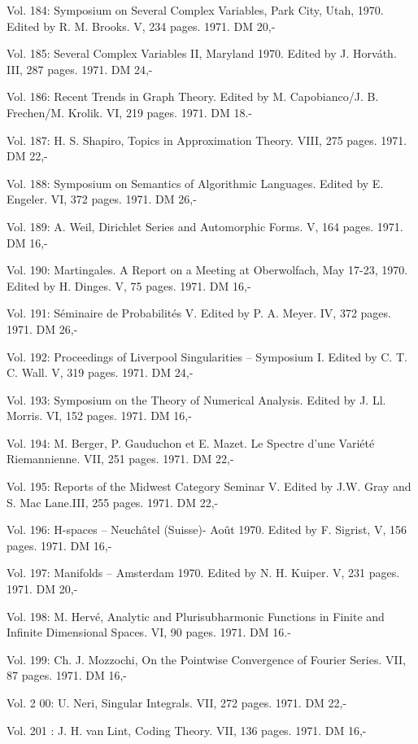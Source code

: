 Vol. 184: Symposium on Several Complex Variables, Park City, Utah, 1970. Edited by R. M. Brooks. V, 234 pages. 1971. DM 20,-

Vol. 185: Several Complex Variables II, Maryland 1970. Edited by J. Horváth. III, 287 pages. 1971. DM 24,-

Vol. 186: Recent Trends in Graph Theory. Edited by M. Capobianco/J. B. Frechen/M. Krolik. VI, 219 pages. 1971. DM 18.-

Vol. 187: H. S. Shapiro, Topics in Approximation Theory. VIII, 275 pages. 1971. DM 22,-

Vol. 188: Symposium on Semantics of Algorithmic Languages. Edited by E. Engeler. VI, 372 pages. 1971. DM 26,-

Vol. 189: A. Weil, Dirichlet Series and Automorphic Forms. V, 164 pages. 1971. DM 16,-

Vol. 190: Martingales. A Report on a Meeting at Oberwolfach, May 17-23, 1970. Edited by H. Dinges. V, 75 pages. 1971. DM 16,-

Vol. 191: Séminaire de Probabilités V. Edited by P. A. Meyer. IV, 372 pages. 1971. DM 26,-

Vol. 192: Proceedings of Liverpool Singularities -- Symposium I. Edited by C. T. C. Wall. V, 319 pages. 1971. DM 24,-

Vol. 193: Symposium on the Theory of Numerical Analysis. Edited by J. Ll. Morris. VI, 152 pages. 1971. DM 16,-

Vol. 194: M. Berger, P. Gauduchon et E. Mazet. Le Spectre d'une Variété Riemannienne. VII, 251 pages. 1971. DM 22,-

Vol. 195: Reports of the Midwest Category Seminar V. Edited by J.W. Gray and S. Mac Lane.III, 255 pages. 1971. DM 22,-

Vol. 196: H-spaces -- Neuchâtel (Suisse)- Août 1970. Edited by F. Sigrist, V, 156 pages. 1971. DM 16,-

Vol. 197: Manifolds -- Amsterdam 1970. Edited by N. H. Kuiper. V, 231 pages. 1971. DM 20,-

Vol. 198: M. Hervé, Analytic and Plurisubharmonic Functions in Finite and Infinite Dimensional Spaces. VI, 90 pages. 1971. DM 16.-

Vol. 199: Ch. J. Mozzochi, On the Pointwise Convergence of Fourier Series. VII, 87 pages. 1971. DM 16,-

Vol. 2 00: U. Neri, Singular Integrals. VII, 272 pages. 1971. DM 22,-

Vol. 201 : J. H. van Lint, Coding Theory. VII, 136 pages. 1971. DM 16,-

